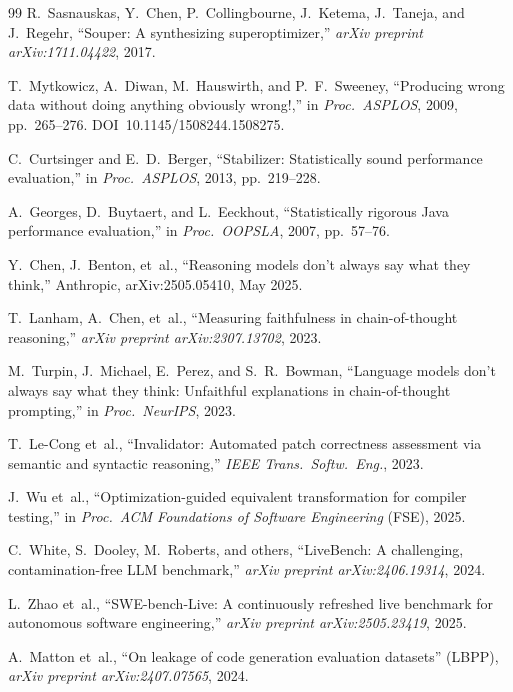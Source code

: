 \begin{thebibliography}{99}
R.~Sasnauskas, Y.~Chen, P.~Collingbourne, J.~Ketema, J.~Taneja, and J.~Regehr, ``Souper: A synthesizing superoptimizer,'' \textit{arXiv preprint arXiv:1711.04422}, 2017.

T.~Mytkowicz, A.~Diwan, M.~Hauswirth, and P.~F.~Sweeney, ``Producing wrong data without doing anything obviously wrong!,'' in \textit{Proc.\ ASPLOS}, 2009, pp.~265--276. DOI~10.1145/1508244.1508275.

C.~Curtsinger and E.~D.~Berger, ``Stabilizer: Statistically sound performance evaluation,'' in \textit{Proc.\ ASPLOS}, 2013, pp.~219--228.

A.~Georges, D.~Buytaert, and L.~Eeckhout, ``Statistically rigorous Java performance evaluation,'' in \textit{Proc.\ OOPSLA}, 2007, pp.~57--76.

Y.~Chen, J.~Benton, et~al., ``Reasoning models don't always say what they think,'' Anthropic, arXiv:2505.05410, May 2025.

T.~Lanham, A.~Chen, et~al., ``Measuring faithfulness in chain-of-thought reasoning,'' \textit{arXiv preprint arXiv:2307.13702}, 2023.

M.~Turpin, J.~Michael, E.~Perez, and S.~R.~Bowman, ``Language models don't always say what they think: Unfaithful explanations in chain-of-thought prompting,'' in \textit{Proc.\ NeurIPS}, 2023.

T.~Le-Cong et~al., ``Invalidator: Automated patch correctness assessment via semantic and syntactic reasoning,'' \textit{IEEE Trans.\ Softw.\ Eng.}, 2023.

J.~Wu et~al., ``Optimization-guided equivalent transformation for compiler testing,'' in \textit{Proc.\ ACM Foundations of Software Engineering} (FSE), 2025.

C.~White, S.~Dooley, M.~Roberts, and others, ``LiveBench: A challenging, contamination-free LLM benchmark,'' \textit{arXiv preprint arXiv:2406.19314}, 2024.

L.~Zhao et~al., ``SWE-bench-Live: A continuously refreshed live benchmark for autonomous software engineering,'' \textit{arXiv preprint arXiv:2505.23419}, 2025.

A.~Matton et~al., ``On leakage of code generation evaluation datasets'' (LBPP), \textit{arXiv preprint arXiv:2407.07565}, 2024.


\end{thebibliography}
